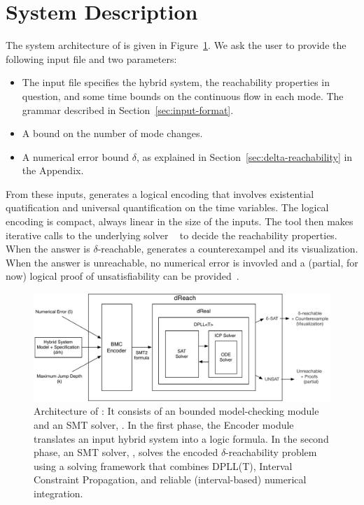 \section{System Description}\label{sec:system}
The system architecture of \dReach{} is given in Figure~\ref{sec:system}. We ask the user to provide the following input file and two parameters:
\begin{itemize}
\item The input file specifies the hybrid system, the reachability
  properties in question, and some time bounds on the continuous flow in each mode. 
  The grammar described in
  Section~\ref{sec:input-format}.
\item A bound on the number of mode changes.
\item A numerical error bound $\delta$, as explained in Section~\ref{sec:delta-reachability} in the Appendix.
\end{itemize}
From these inputs, \dReach{} generates a logical encoding that involves existential quatification and universal quantification on the time variables. The logical encoding is compact, always linear in the size of the inputs. The tool then makes iterative calls to the underlying solver \dReal{}~\cite{DBLP:conf/cade/GaoKC13} to decide the reachability properties. When the answer is {\sf $\delta$-reachable}, \dReach{} generates a counterexampel and its visualization. When the answer is {\sf unreachable}, no numerical error is invovled and a (partial, for now) logical proof of unsatisfiability can be provided~\cite{}. 
\begin{figure}[!h]
  \centering
  \includegraphics[width=\textwidth]{images/dreach_archi}
  \caption{Architecture of \dReach{}: It consists of an bounded
    model-checking module and an SMT solver, \dReal{}. In the first
    phase, the Encoder module translates an input hybrid system into a
    logic formula. In the second phase, an
    SMT solver, \dReal{}, solves the encoded $\delta$-reachability
    problem using a solving framework that combines DPLL(T), Interval Constraint Propagation, and reliable (interval-based) numerical integration.
  }\label{fig:system-description}
\end{figure}



